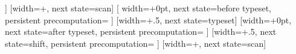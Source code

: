 {{                \fi%
        \fi%
        \let\pgfdecorationrestoftext=\pgfdecorationtext%
    }]{}%
[width=+\pgf@lib@dec@text@indent@left, next state=scan]{}%
%
[
    width=+0pt,
    next state=before typeset,
    persistent precomputation={
        \pgf@lib@dec@text@scanchar%
        \ifvoid\pgf@lib@dec@text@box%
            \setbox\pgf@lib@dec@text@box\hbox{}%
            \wd{}\relax%
        \fi%
}]{}%
%
[width=+.5\wd\pgf@lib@dec@text@box, next state=typeset]{}%
%
[width=+0pt, next state=after typeset,
  persistent precomputation={
    \pgfmathanglebetweenpoints%
    {\pgfpointlineatdistance{\pgfdecoratedinputsegmentcompleteddistance}{\pgf@decorate@inputsegment@first}{\pgf@decorate@inputsegment@last}}%
    {\tikz@lib@dec@te@yvecendpoint}%
    \xdef\tikz@lib@dec@te@yvecangle{\pgfmathresult}
  }
]
{%
  \pgftransformxshift{+-.5\wd\pgf@lib@dec@text@box}%
  \setbox\pgf@hbox\hbox{\copy\pgf@lib@dec@text@box}%
  \pgftransformtriangle%
  {}%
  {}%
  {\pgfpointpolar{\tikz@lib@dec@te@yvecangle-\pgfdecoratedangle}{1cm}}%
  \pgftransformshift{\pgfpoint{0pt}{\tikz@lib@dec@te@threedimraisevar}}
  \pgfqboxsynced\pgf@hbox%
}%
[width=+.5\wd\pgf@lib@dec@text@box, next state=shift,
    persistent precomputation={%
    \ifpgf@lib@dec@text@fit%
        \ifpgf@lib@dec@text@stretch@spaces%
            \ifpgf@lib@dec@text@scan@space%
                \let\pgf@lib@dec@text@shift=\pgf@lib@dec@text@space@shift%
            \else%
                \def\pgf@lib@dec@text@shift{0pt}%
            \fi%
        \else%
            \let\pgf@lib@dec@text@shift=\pgf@lib@dec@text@character@shift%
          \fi%
        \else%
            \def\pgf@lib@dec@text@shift{0pt}%
      \fi%
  }]{}%
[width=+\pgf@lib@dec@text@shift, next state=scan]{}%
%
}%


%
\def\tikz@lib@dec@te@parse@stylecharacters#1#2{%
  \def\tikz@lib@dec@te@text{#1}%
  \tikz@lib@dec@te@scancharacters{%
    \pgfkeysalso{/pgf/decoration/text effects/character {\meaning\tikz@lib@dec@te@character}/.style={#2}}%
  }%
}%

%
\def\tikz@lib@dec@te@parse@replacecharacters#1#2{%
  \def\tikz@lib@dec@te@text{#1}%
  \tikz@lib@dec@te@scancharacters{%
    \expandafter\def\csname tikz@lib@dec@te@character@replacements@\meaning\tikz@lib@dec@te@character @code\endcsname{#2}%
  }%
}%

\endinput
